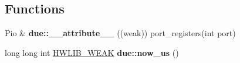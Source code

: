 \subsection*{Functions}
\begin{DoxyCompactItemize}
\item 
Pio \& {\bfseries due\+::\+\_\+\+\_\+attribute\+\_\+\+\_\+} ((weak)) port\+\_\+registers(int port)\hypertarget{namespacedue_a691468d1eaea9eb36a06b94e7c27d6fa}{}\label{namespacedue_a691468d1eaea9eb36a06b94e7c27d6fa}

\item 
long long int \hyperlink{hwlib-defines_8hpp_a04be4340016df60d6636c1d1c6d94fc9}{H\+W\+L\+I\+B\+\_\+\+W\+E\+AK} {\bfseries due\+::now\+\_\+us} ()\hypertarget{namespacedue_a763b16adccc73515e1d463402e05fd52}{}\label{namespacedue_a763b16adccc73515e1d463402e05fd52}


\end{DoxyCompactItemize}
